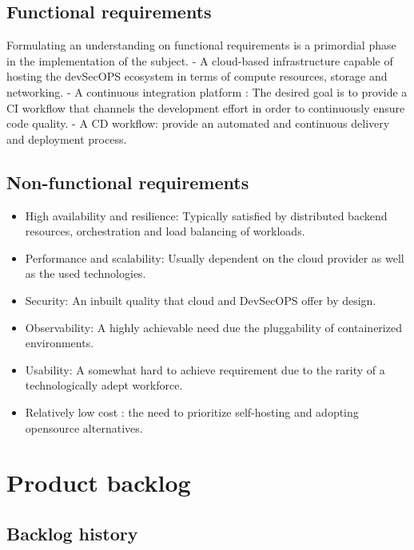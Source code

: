 \subsection{Functional requirements}

Formulating an understanding on functional requirements is a primordial phase in the implementation of the subject.
\newline
-	A cloud-based infrastructure capable of hosting the devSecOPS ecosystem in terms of compute resources, storage and networking.
\newline
-	A continuous integration platform : The desired goal is to provide a CI workflow that channels the development effort in order to continuously ensure code quality.
\newline
-	A CD workflow: provide an automated and continuous delivery and deployment process.

\subsection{Non-functional requirements}
\begin{itemize}[label=\textbullet,font=\normalsize]
\addtolength{\itemindent}{1cm}
\item High availability and resilience: Typically satisfied by distributed backend resources, orchestration and load balancing of workloads. 
\item Performance and scalability: Usually dependent on the cloud provider as well as the used technologies.
\item Security: An inbuilt quality that cloud and DevSecOPS offer by design.
\item Observability: A highly achievable need due the pluggability of containerized environments.
\item Usability: A somewhat hard to achieve requirement due to the rarity of a technologically adept workforce. 
\item Relatively low cost : the need to prioritize self-hosting and adopting opensource alternatives.
\end{itemize}
\newpage
\section{Product backlog }

\subsection{Backlog history }

